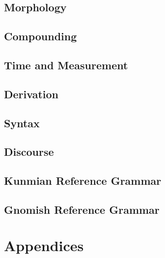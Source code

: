 \documentclass[12pt,letterpaper,openany,twoside]{memoir}
\let\originalpart=\part
\def\part{\cleardoublepage\originalpart}
\begin{document}
\chapter{Morphology}

\chapter{Compounding}

\chapter{Time and Measurement}

\chapter{Derivation}

\chapter{Syntax}

\chapter{Discourse}

\chapter{Kunmian Reference Grammar}

\chapter{Gnomish Reference Grammar}


\appendix

\part{Appendices}


\end{document}
